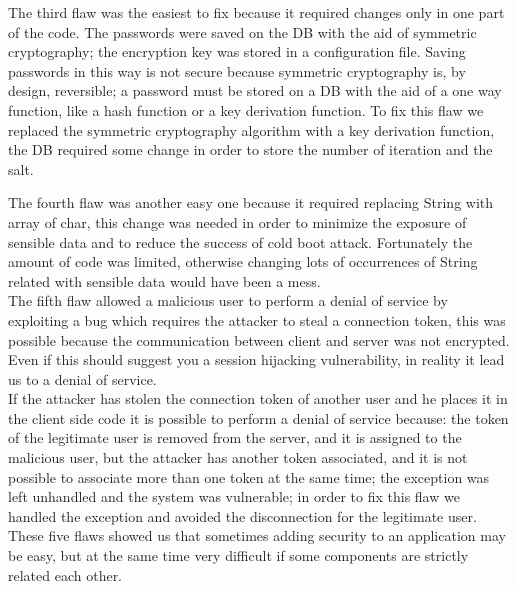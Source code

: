 The third flaw was the easiest to fix because it required changes only in one part of the code.\newline
The passwords were saved on the DB with the aid of symmetric cryptography; the encryption key was stored in a configuration file.\newline
Saving passwords in this way is not secure because symmetric cryptography is, by design, reversible; a password must be stored on a DB with the aid of a one way function, like a hash function or a key derivation function.\newline
To fix this flaw we replaced the symmetric cryptography algorithm with a key derivation function, the DB required some change in order to store the number of iteration and the salt.\newline

The fourth flaw was another easy one because it required replacing String with array of char, this change was needed in order to minimize the exposure of sensible data and to reduce the success of cold boot attack.\newline
Fortunately the amount of code was limited, otherwise changing lots of occurrences of String related with sensible data would have been a mess.\\

The fifth flaw allowed a malicious user to perform a denial of service by exploiting a bug which requires the attacker to steal a connection
token, this was possible because the communication between client and server was not encrypted.\\
Even if this should suggest you a session hijacking vulnerability, in reality it lead us to a denial of service.\\
If the attacker has stolen the connection token of another user and he places it in the client side code it is possible
to perform a denial of service because: the token of the legitimate user is removed from the server, and it is assigned to the malicious user, but 
the attacker has another token associated, and it is not possible to associate more than one token at the same time; the exception was left unhandled and the system was vulnerable; in order to fix this flaw we handled the exception and avoided the disconnection for the legitimate user.\\

These five flaws showed us that sometimes adding security to an application may be easy, but at the same time very difficult if some components are strictly related each other.\\

